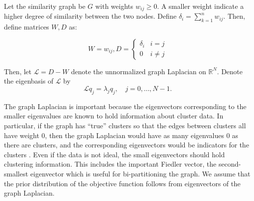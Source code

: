 \documentclass{siamart1116}
\begin{document}
Let the similarity graph be $G$ with weights $w_{ij} \ge 0$. A smaller weight indicate a higher degree of similarity between the two nodes. Define $\delta_i = \sum_{k=1}^n w_{ij}$. Then, define matrices $W, D$ as:

\[W = w_{ij}, D = \begin{cases} 
\delta_i    & i = j \\
0           & i \neq j 
\end{cases}\]

Then, let $\mathcal{L} = D - W$ denote the unnormalized graph Laplacian on $\mathbb{R}^N$. Denote the eigenbasis of $\mathcal{L}$ by
\begin{equation}
\label{eqn:laplacian}
\mathcal{L}q_j = \lambda_j q_j,\quad j=0,\ldots,N-1.
\end{equation}

The graph Laplacian is important because the eigenvectors corresponding to the smaller eigenvalues are known to hold information about cluster data. In particular, if the graph has ``true'' clusters so that the edges between clusters all have weight 0, then the graph Laplacian would have as many eigenvalues 0 as there are clusters, and the corresponding eigenvectors would be indicators for the clusters \cite{Spectral}. Even if the data is not ideal, the small eigenvectors should hold clustering information. This includes the important Fiedler vector, the second-smallest eigenvector which is useful for bi-partitioning the graph. We assume that the prior distribution of the objective function follows from eigenvectors of the graph Laplacian.
\end{document}

